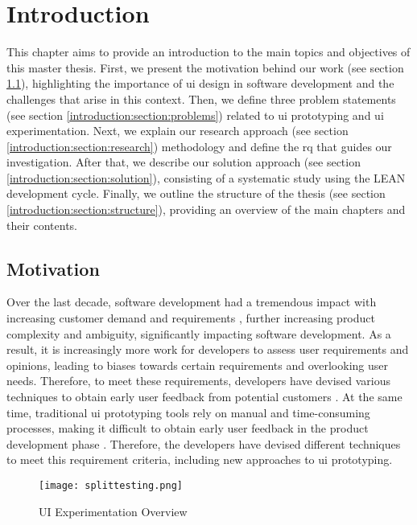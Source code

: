 
\chapter{Introduction}
\label{chap:introduction}
\ifpdf
    \graphicspath{{Chapters/Introduction/Figs/}{Chapters/Introduction/Figs/}{Chapters/Introduction/Figs/}}
\else
    \graphicspath{{Chapters/Introduction/Figs/}{Chapters/Introduction/Figs/}}
\fi
This chapter aims to provide an introduction to the main topics and objectives of this master thesis. 
First, we present the motivation behind our work (see section \ref{introduction:section:motivation}), highlighting the importance of \ac{ui} design in software development and the challenges that arise in this context.
Then, we define three problem statements (see section \ref{introduction:section:problems}) related to \ac{ui} prototyping and \ac{ui} experimentation. 
Next, we explain our research approach (see section \ref{introduction:section:research}) methodology and define the \ac{rq} that guides our investigation. 
After that, we describe our solution approach (see section \ref{introduction:section:solution}), consisting of a systematic study using the LEAN development cycle. 
Finally, we outline the structure of the thesis (see section \ref{introduction:section:structure}), providing an overview of the main chapters and their contents.

\section{Motivation} %
\label{introduction:section:motivation}

Over the last decade, software development had a tremendous impact with increasing customer demand and requirements \cite{article:swdemand:ahmed}, further increasing product complexity and ambiguity, significantly impacting software development.
As a result, it is increasingly more work for developers to assess user requirements and opinions, leading to biases towards certain requirements and overlooking user needs.
Therefore, to meet these requirements, developers have devised various techniques to obtain early user feedback from potential customers \cite{misc:expperiments:split}. 
At the same time, traditional \ac{ui} prototyping tools rely on manual and time-consuming processes, making it difficult to obtain early user feedback in the product development phase \cite{paper:prototyping:luqi}.
Therefore, the developers have devised different techniques to meet this requirement criteria, including new approaches to \ac{ui} prototyping.
\begin{figure}[ht]
    \centering
    \texttt{[image: splittesting.png]}
    \caption[Split Testing]{UI Experimentation Overview \cite{misc:expperiments:split}}
    \label{intro:fig:splittesting}
\end{figure}


